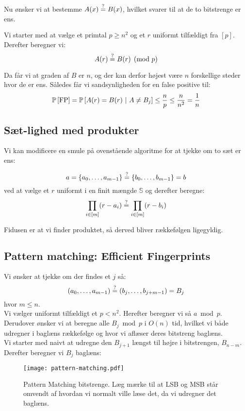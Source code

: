Nu ønsker vi at bestemme $A(x) \stackrel{?}{=} B(x)$, hvilket svarer til at de to bitstrenge er ens.

Vi starter med at vælge et primtal $p \geq n^2$ og et $r$ uniformt tilfældigt fra $[p]$. Derefter beregner vi:
$$
  A(r) \stackrel{?}{=} B(r) \pmod p
$$

Da får vi at graden af $B$ er $n$, og der kan derfor højest være $n$ forskellige steder hvor de er ens. Således får vi sandsynligheden for en false positive til:
$$
  \P{\text{FP}}
  = \P{A(r) = B(r) \ | A \neq B_j}
  \leq \frac{n}{p}
  \leq \frac{n}{n^2}
  = \frac{1}{n}
$$

\subsection{Sæt-lighed med produkter}
Vi kan modificere en smule på ovenstående algoritme for at tjekke om to sæt er ens:

$$
  a = \{a_0, \dots, a_{m-1} \}
  \stackrel{?}{=}
  \{b_0, \dots, b_{m-1} \} = b
$$
ved at vælge et $r$ uniformt i en finit mængde $\mathbb S$ og derefter beregne:
$$
  \prod_{i \in [m]} (r - a_i) \stackrel{?}{=}
  \prod_{i \in [m]} (r - b_i)
$$

Fidusen er at vi finder produktet, så derved bliver rækkefølgen ligegyldig.


\subsection{Pattern matching: Efficient Fingerprints}
Vi ønsker at tjekke om der findes et $j$ så:
$$
  (a_0, \dots, a_{m-1}) \stackrel{?}{=} (b_j, \dots, b_{j+m-1}) = B_j
$$
hvor $m \leq n$.\\

Vi vælger uniformt tilfældigt et $p < n^2$. Herefter beregner vi så $a \bmod p$. Derudover ønsker vi at beregne alle $B_j \bmod p$ i $O(n)$ tid, hvilket vi både udregner i baglæns rækkefølge og hvor vi aflæser deres bitstreng baglæns.\\

Vi starter med naivt at udregne den $B_{j+1}$ længst til højre i bitstrengen, $B_{n-m}$. Derefter beregner vi $B_j$ baglæns:

\begin{figure}[H]
  \begin{center}
  \texttt{[image: pattern-matching.pdf]}
  \end{center}
  \caption{Pattern Matching bitstrenge. Læg mærke til at LSB og MSB står omvendt af hvordan vi normalt ville læse det, da vi udregner det baglæns.}
  \label{fig:pattern}
\end{figure}


